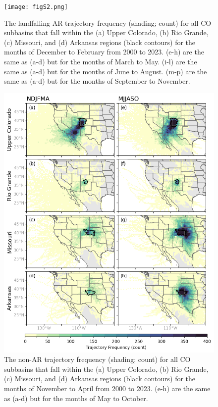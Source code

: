 \documentclass[jgrga]{agutexSI2019}
\begin{document}
\begin{article}
\begin{figure}
\noindent\texttt{[image: figS2.png]}
\caption{
The landfalling AR trajectory frequency (shading; count) for all CO subbasins that fall within the (a) Upper Colorado, (b) Rio Grande, (c) Missouri, and (d) Arkansas regions (black contours) for the months of December to February from 2000 to 2023. (e-h) are the same as (a-d) but for the months of March to May. (i-l) are the same as (a-d) but for the months of June to August. (m-p) are the same as (a-d) but for the months of September to November.}
\label{fig:supp:heatmap_ssn}
\end{figure}
\clearpage

\begin{figure}
\noindent\includegraphics[scale=0.8]{figS3.png}
\caption{The non-AR trajectory frequency (shading; count) for all CO subbasins that fall within the (a) Upper Colorado, (b) Rio Grande, (c) Missouri, and (d) Arkansas regions (black contours) for the months of November to April from 2000 to 2023. (e-h) are the same as (a-d) but for the months of May to October.}
\label{fig:supp:non_AR_heatmaps}
\end{figure}
\clearpage


\end{article}
\end{document}
